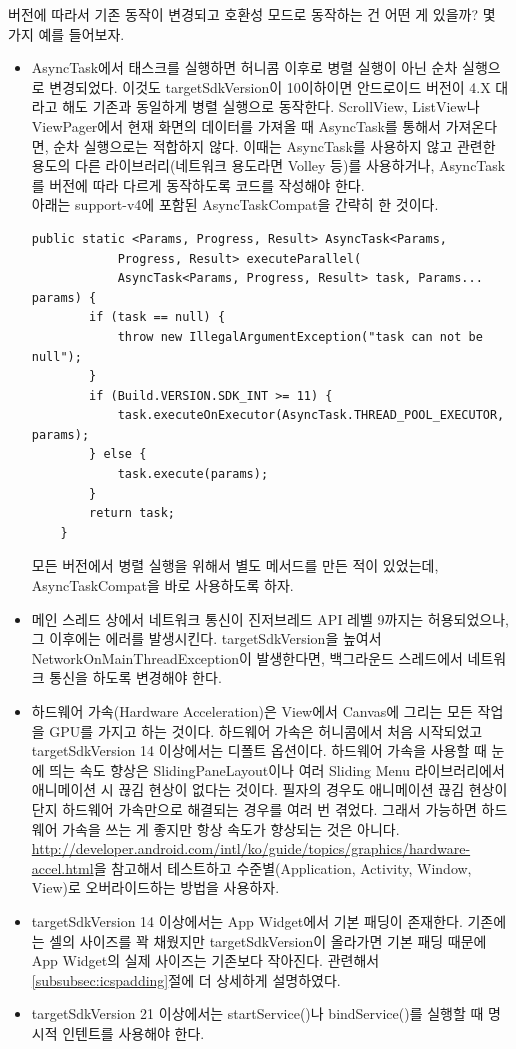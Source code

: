 버전에 따라서 기존 동작이 변경되고 호환성 모드로 동작하는 건 어떤 게 있을까? 몇 가지 예를 들어보자.
\begin{itemize}
\item AsyncTask에서 태스크를 실행하면 허니콤 이후로 병렬 실행이 아닌 순차 실행으로 변경되었다. 이것도 targetSdkVersion이 10이하이면 안드로이드 버전이 4.X 대라고 해도 기존과 동일하게 병렬 실행으로 동작한다. ScrollView, ListView나  ViewPager에서 현재 화면의 데이터를 가져올 때 AsyncTask를 통해서 가져온다면, 순차 실행으로는 적합하지 않다. 이때는  AsyncTask를 사용하지 않고 관련한 용도의 다른 라이브러리(네트워크 용도라면 Volley 등)를 사용하거나, AsyncTask를 버전에 따라 다르게 동작하도록 코드를 작성해야 한다.\\

아래는 support-v4에 포함된 AsyncTaskCompat을 간략히 한 것이다.
\begin{lstlisting}[frame=single]
	public static <Params, Progress, Result> AsyncTask<Params,
			Progress, Result> executeParallel(
            AsyncTask<Params, Progress, Result> task, Params... params) {
        if (task == null) {
            throw new IllegalArgumentException("task can not be null");
        }
        if (Build.VERSION.SDK_INT >= 11) {
            task.executeOnExecutor(AsyncTask.THREAD_POOL_EXECUTOR, params);
        } else {
            task.execute(params);
        }
        return task;
    }
\end{lstlisting}
모든 버전에서 병렬 실행을 위해서 별도 메서드를 만든 적이 있었는데, AsyncTaskCompat을 바로 사용하도록 하자.

\item 메인 스레드 상에서 네트워크 통신이 진저브레드 API 레벨 9까지는 허용되었으나, 그 이후에는 에러를 발생시킨다. targetSdkVersion을 높여서 NetworkOnMainThreadException이 발생한다면, 백그라운드 스레드에서 네트워크 통신을 하도록 변경해야 한다.
\item 하드웨어 가속(Hardware Acceleration)은 View에서 Canvas에 그리는 모든 작업을 GPU를 가지고 하는 것이다. 하드웨어 가속은 허니콤에서 처음 시작되었고 targetSdkVersion 14 이상에서는 디폴트 옵션이다. 하드웨어 가속을 사용할 때 눈에 띄는 속도 향상은 SlidingPaneLayout이나 여러 Sliding Menu 라이브러리에서 애니메이션 시 끊김 현상이 없다는 것이다. 
필자의 경우도 애니메이션 끊김 현상이 단지 하드웨어 가속만으로 해결되는 경우를 여러 번 겪었다.
그래서 가능하면 하드웨어 가속을 쓰는 게 좋지만 항상 속도가 향상되는 것은 아니다. \url{http://developer.android.com/intl/ko/guide/topics/graphics/hardware-accel.html}을 참고해서 테스트하고 수준별(Application, Activity, Window, View)로 오버라이드하는 방법을 사용하자.
\item targetSdkVersion 14 이상에서는 App Widget에서 기본 패딩이 존재한다. 기존에는 셀의 사이즈를 꽉 채웠지만 targetSdkVersion이 올라가면 기본 패딩 때문에 App Widget의 실제 사이즈는 기존보다 작아진다. 관련해서 \ref{subsubsec:icspadding}절에 더 상세하게 설명하였다.
\item targetSdkVersion 21 이상에서는 startService()나 bindService()를 실행할 때 명시적 인텐트를 사용해야 한다.
\end{itemize}


